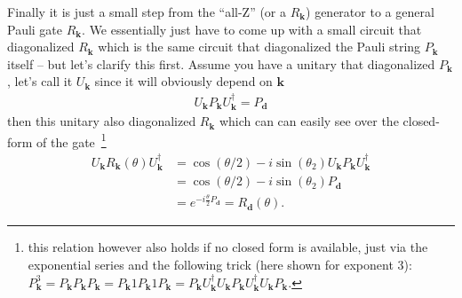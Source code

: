 Finally it is just a small step from the ``all-Z'' (or a  $R_\mathbf{k}$) generator to a general Pauli gate $R_\mathbf{k}$.
We essentially just have to come up with a small circuit that diagonalized $R_\mathbf{k}$ which is the same circuit that diagonalized the Pauli string $P_\mathbf{k}$ itself -- but let's clarify this first.
Assume you have a unitary that diagonalized $P_\mathbf{k}$, let's call it $U_\mathbf{k}$ since it will obviously depend on $\mathbf{k}$
\begin{align}
    U_\mathbf{k} P_\mathbf{k}U_\mathbf{k}^\dagger = P_\mathbf{d}
\end{align}
then this unitary also diagonalized $R_\mathbf{k}$ which can can easily see over the closed-form of the gate~\footnote{this relation however also holds if no closed form is available, just via the exponential series and the following trick (here shown for exponent 3): $P_\mathbf{k}^3 = P_\mathbf{k}P_\mathbf{k}P_\mathbf{k} = P_\mathbf{k}1P_\mathbf{k}1P_\mathbf{k} = P_\mathbf{k}U_\mathbf{k}^\dagger U_\mathbf{k} P_\mathbf{k}U_\mathbf{k}^\dagger U_\mathbf{k}P_\mathbf{k} $.}
\begin{align}
    U_\mathbf{k}R_\mathbf{k}(\theta)U_\mathbf{k}^\dagger &= \cos(\theta/2) -i \sin(\theta_2)U_\mathbf{k}P_\mathbf{k}U_\mathbf{k}^\dagger  \nonumber\\
    &= \cos(\theta/2) -i \sin(\theta_2)P_\mathbf{d}\nonumber\\
    &= e^{-i \frac{\theta}{2}P_\mathbf{d}} = R_\mathbf{d}(\theta).
\end{align}

